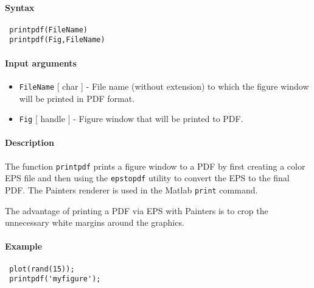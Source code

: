 


	\paragraph{Syntax}
 
 \begin{verbatim}
 printpdf(FileName)
 printpdf(Fig,FileName)
 \end{verbatim}
 
 \paragraph{Input arguments}
 
 \begin{itemize}
 \item
   \texttt{FileName} {[} char {]} - File name (without extension) to
   which the figure window will be printed in PDF format.
 \item
   \texttt{Fig} {[} handle {]} - Figure window that will be printed to
   PDF.
 \end{itemize}
 
 \paragraph{Description}
 
 The function \texttt{printpdf} prints a figure window to a PDF by first
 creating a color EPS file and then using the \texttt{epstopdf} utility
 to convert the EPS to the final PDF. The Painters renderer is used in
 the Matlab \texttt{print} command.
 
 The advantage of printing a PDF via EPS with Painters is to crop the
 unnecessary white margins around the graphics.
 
 \paragraph{Example}
 
 \begin{verbatim}
 plot(rand(15));
 printpdf('myfigure');
 \end{verbatim}


